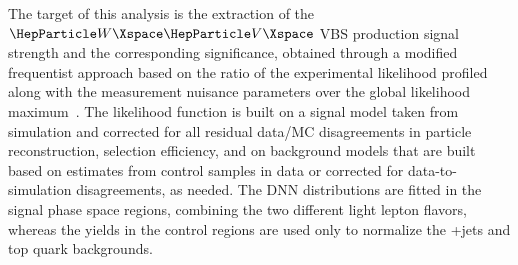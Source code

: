 The target of this analysis is the extraction of the $\PW\PV$ VBS production signal strength and the corresponding
significance, obtained through a modified frequentist approach based on the ratio of the experimental likelihood
profiled along with the measurement nuisance parameters over the global likelihood maximum~\cite{Cowan:2010js}.
The likelihood function is built on a signal model taken from simulation and corrected for all residual data/MC
disagreements in particle reconstruction, selection efficiency, and on background models that are built based on
estimates from control samples in data or corrected for data-to-simulation disagreements, as needed.  The DNN
distributions are fitted in the signal phase space regions, combining the two different light lepton flavors, whereas
the yields in the control regions are used only to normalize the {\PW}+jets and top quark backgrounds.






